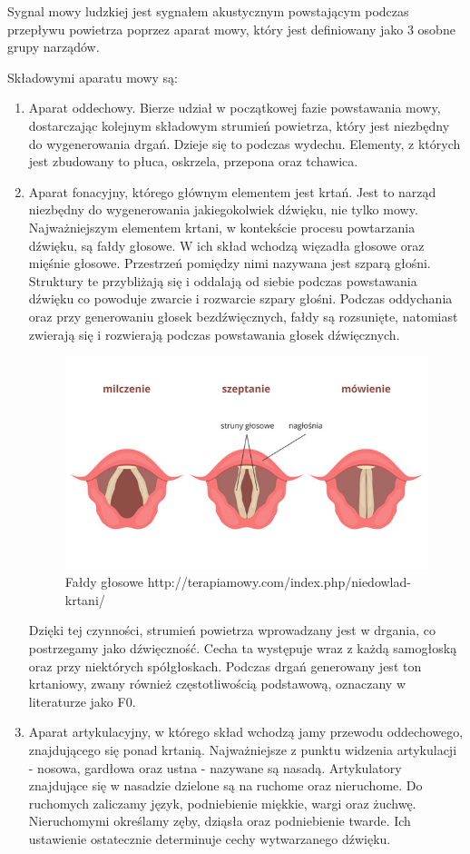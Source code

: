 \documentclass[a4paper,12 pt]{article}
\begin{document}
Sygnal mowy ludzkiej jest sygnałem akustycznym powstającym podczas przepływu powietrza poprzez aparat mowy, który jest definiowany jako 3 osobne grupy narządów. 

Składowymi aparatu mowy są:
\begin{enumerate}
\item Aparat oddechowy. Bierze udział w początkowej fazie powstawania mowy, dostarczając kolejnym składowym strumień powietrza, który jest niezbędny do wygenerowania drgań. Dzieje się to podczas wydechu. Elementy, z których jest zbudowany to płuca, oskrzela, przepona oraz tchawica.

\item Aparat fonacyjny, którego głównym elementem jest krtań. Jest to narząd niezbędny do wygenerowania jakiegokolwiek dźwięku, nie tylko mowy. Najważniejszym elementem krtani, w kontekście procesu powtarzania dźwięku, są fałdy głosowe. W ich skład wchodzą więzadła głosowe oraz mięśnie głosowe. Przestrzeń pomiędzy nimi nazywana jest szparą głośni. Struktury te przybliżają się i oddalają od siebie podczas powstawania dźwięku co powoduje zwarcie i rozwarcie szpary głośni. Podczas oddychania oraz przy generowaniu głosek bezdźwięcznych, fałdy są rozsunięte, natomiast zwierają się  i rozwierają podczas powstawania głosek dźwięcznych. 

\begin{figure}[!htbp]

\centering
\includegraphics[scale=0.5]{faldy_glosowe}
\caption{Fałdy głosowe http://terapiamowy.com/index.php/niedowlad-krtani/}

\end{figure}
\FloatBarrier

Dzięki tej czynności, strumień powietrza wprowadzany jest w drgania, co postrzegamy jako dźwięczność. Cecha ta występuje wraz z każdą samogłoską oraz przy niektórych spółgłoskach. Podczas drgań generowany jest ton krtaniowy, zwany również częstotliwością podstawową, oznaczany w literaturze jako F0. 
\item Aparat artykulacyjny, w którego skład wchodzą jamy przewodu oddechowego, znajdującego się ponad krtanią. Najważniejsze z punktu widzenia artykulacji - nosowa, gardłowa oraz ustna - nazywane są nasadą. Artykulatory znajdujące się w nasadzie dzielone są na ruchome oraz nieruchome. Do ruchomych zaliczamy język, podniebienie miękkie, wargi oraz żuchwę. Nieruchomymi określamy zęby, dziąsła oraz podniebienie twarde. Ich ustawienie ostatecznie determinuje cechy wytwarzanego dźwięku. 
\end{enumerate}
\end{document}
